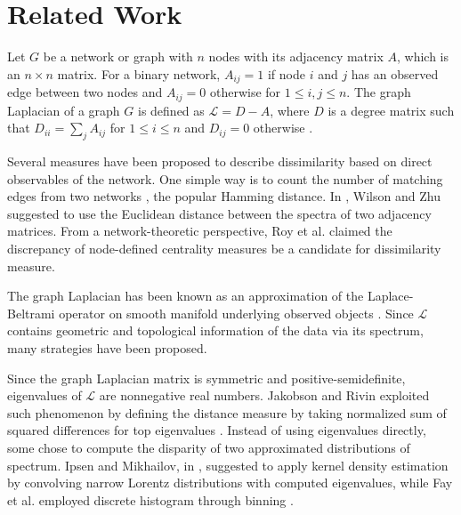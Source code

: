 \documentclass{amsart}
\begin{document}


\section{Related Work}	\label{review}


Let $G$ be a network or graph with $n$ nodes with its adjacency matrix $A$, which is an $n\times n$ matrix. For a binary network, $A_{ij} = 1$ if node $i$ and $j$ has an observed edge between two nodes and $A_{ij}=0$ otherwise for $1\leq i,j \leq n$. The graph Laplacian of a graph $G$ is defined as $\mathcal{L} = D-A$, where $D$ is a degree matrix such that $D_{ii} = \sum_{j}A_{ij}$ for $1\leq i \leq n$ and $D_{ij}=0$ otherwise \cite{von_luxburg_tutorial_2007}. 

Several measures have been proposed to describe dissimilarity based on direct observables of the network. One simple way is to count the number of matching edges from two networks \cite{hamming_error_1950}, the popular Hamming distance. In \cite{wilson_study_2008}, Wilson and Zhu suggested to use the Euclidean distance between the spectra of two adjacency matrices. From a network-theoretic perspective, Roy et al. \cite{roy_modeling_2014} claimed the discrepancy of node-defined centrality measures be a candidate for dissimilarity measure. 

The graph Laplacian has been known as an approximation of the Laplace-Beltrami operator on smooth manifold underlying observed objects \cite{gine_empirical_2006}. Since $\mathcal{L}$ contains geometric and topological information of the data via its spectrum, many strategies have been proposed. 

Since the graph Laplacian matrix is symmetric and positive-semidefinite, eigenvalues of $\mathcal{L}$ are nonnegative real numbers. Jakobson and Rivin exploited such phenomenon by defining the distance measure by taking normalized sum of squared differences for top eigenvalues \cite{jakobson_extremal_2002}. Instead of using eigenvalues directly, some chose to compute the disparity of two approximated distributions of spectrum. Ipsen and Mikhailov, in \cite{ipsen_evolutionary_2002}, suggested to apply kernel density estimation by convolving narrow Lorentz distributions with computed eigenvalues, while  Fay et al. employed discrete histogram through binning \cite{fay_weighted_2010}.
\end{document}
